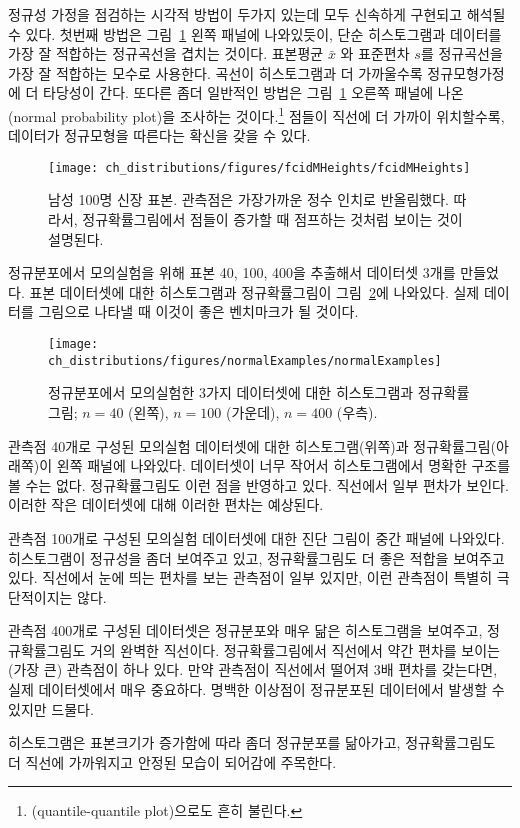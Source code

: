 정규성 가정을 점검하는 시각적 방법이 두가지 있는데 모두 신속하게 구현되고 해석될 수 있다. 첫번째 방법은 그림~\ref{fcidMHeights} 왼쪽 패널에 나와있듯이, 단순 히스토그램과 데이터를 가장 잘 적합하는 정규곡선을 겹치는 것이다. 표본평균 $\bar{x}$ 와 표준편차 $s$를 정규곡선을 가장 잘 적합하는 모수로 사용한다. 곡선이 히스토그램과 더 가까울수록 정규모형가정에 더 타당성이 간다. 또다른 좀더 일반적인 방법은 그림~\ref{fcidMHeights} 오른쪽 패널에 나온 (normal probability plot)을 조사하는 것이다.\footnote{(quantile-quantile plot)으로도 흔히 불린다.} 점들이 직선에 더 가까이 위치할수록, 데이터가 정규모형을 따른다는 확신을 갖을 수 있다.

\begin{figure}
\centering
\texttt{[image: ch\_distributions/figures/fcidMHeights/fcidMHeights]}
\caption{남성 100명 신장 표본. 관측점은 가장가까운 정수 인치로 반올림했다. 따라서, 정규확률그림에서 점들이 증가할 때 점프하는 것처럼 보이는 것이 설명된다.}
\label{fcidMHeights}
\end{figure}

\textC{\newpage}

\begin{example}{정규분포에서 모의실험을 위해 표본 40, 100, 400을 추출해서 데이터셋 3개를 만들었다. 표본 데이터셋에 대한 히스토그램과 정규확률그림이 그림~\ref{normalExamples}에 나와있다. 실제 데이터를 그림으로 나타낼 때 이것이 좋은 벤치마크가 될 것이다.} \label{normalExamplesExample}

\begin{figure}
\centering
\texttt{[image: ch\_distributions/figures/normalExamples/normalExamples]}
\caption{정규분포에서 모의실험한 3가지 데이터셋에 대한 히스토그램과 정규확률그림; $n=40$ (왼쪽), $n=100$ (가운데), $n=400$ (우측).}
\label{normalExamples}
\end{figure}

관측점 40개로 구성된 모의실험 데이터셋에 대한 히스토그램(위쪽)과 정규확률그림(아래쪽)이 왼쪽 패널에 나와있다. 데이터셋이 너무 작어서 히스토그램에서 명확한 구조를 볼 수는 없다. 정규확률그림도 이런 점을 반영하고 있다. 직선에서 일부 편차가 보인다. 이러한 작은 데이터셋에 대해 이러한 편차는 예상된다.

관측점 100개로 구성된 모의실험 데이터셋에 대한 진단 그림이 중간 패널에 나와있다. 히스토그램이 정규성을 좀더 보여주고 있고, 정규확률그림도 더 좋은 적합을 보여주고 있다. 직선에서 눈에 띄는 편차를 보는 관측점이 일부 있지만, 이런 관측점이 특별히 극단적이지는 않다. 

관측점 400개로 구성된 데이터셋은 정규분포와 매우 닮은 히스토그램을 보여주고, 정규확률그림도 거의 완벽한 직선이다. 정규확률그림에서 직선에서 약간 편차를 보이는 (가장 큰) 관측점이 하나 있다. 만약 관측점이 직선에서 떨어져 3배 편차를 갖는다면, 실제 데이터셋에서 매우 중요하다. 명백한 이상점이 정규분포된 데이터에서 발생할 수 있지만 드물다.

히스토그램은 표본크기가 증가함에 따라 좀더 정규분포를 닮아가고, 정규확률그림도 더 직선에 가까워지고 안정된 모습이 되어감에 주목한다.

\end{example}

